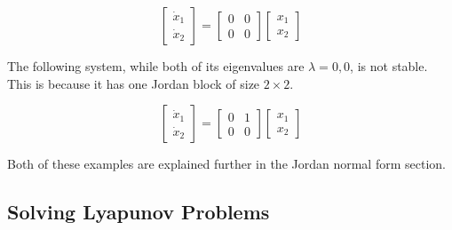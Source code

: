 \begin{equation*}
  \left[ \begin{array}{c} \dot{x}_{1} \\ \dot{x}_{2} \end{array} \right]=
  \left[ \begin{array}{cc} 0 & 0 \\ 0 & 0 \end{array} \right]
  \left[ \begin{array}{c} x_{1} \\ x_{2} \end{array} \right]
\end{equation*}

The following system, while both of its eigenvalues are $\lambda=0,0$, is not stable.
This is because it has one Jordan block of size $2\times2$.

\begin{equation*}
  \left[ \begin{array}{c} \dot{x}_{1} \\ \dot{x}_{2} \end{array} \right]=
  \left[ \begin{array}{cc} 0 & 1 \\ 0 & 0 \end{array} \right]
  \left[ \begin{array}{c} x_{1} \\ x_{2} \end{array} \right]
\end{equation*}

Both of these examples are explained further in the Jordan normal form section.

\subsection{Solving Lyapunov Problems}

